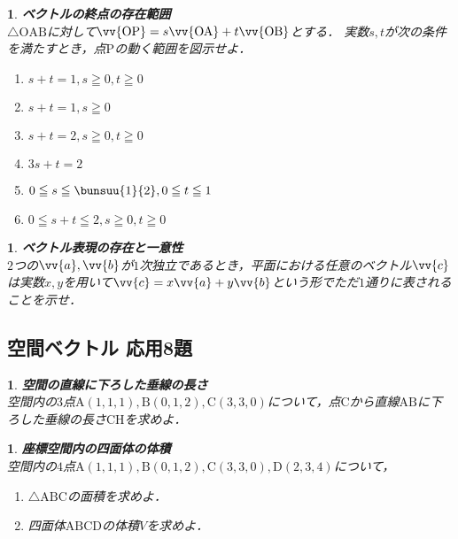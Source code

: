 \documentclass[10pt,
fleqn,
dvipdfmx,
uplatex
]{jsarticle}
\newtheorem{question}[Question]{}
\begin{document}
\begin{question}{\bf\boldmath ベクトルの終点の存在範囲}\\
$\triangle \text{OAB}$に対して$\vv {\text{OP}}=s\vv {\text{OA}}+t\vv {\text{OB}}$とする．
実数$s, t$が次の条件を満たすとき，点$\text{P}$の動く範囲を図示せよ．
\begin{enumerate}
\item $s+t=1, s\geqq 0, t\geqq 0$
\item $s+t=1, s\geqq 0$
\item $s+t=2, s\geqq 0, t\geqq 0$
\item $3s+t=2$
\item $0\leqq s\leqq \bunsuu{1}{2}, 0\leqq t\leqq 1$
\item $0\leqq s+t\leqq 2, s\geqq 0, t\geqq 0$
\end{enumerate}

\end{question}



\begin{question}{\bf\boldmath ベクトル表現の存在と一意性}\\
$2$つの$\vv {a}, \vv {b}$が$1$次独立であるとき，平面における任意のベクトル$\vv {c}$は実数$x, ‌y$を用いて$\vv {c}=x\vv {a}+y\vv {b}$という形でただ$1$通りに表されることを示せ．
\end{question}

\subsection{空間ベクトル 応用8題}



\begin{question}{\bf\boldmath 空間の直線に下ろした垂線の長さ}\\
空間内の$3$点$\text{A}\left(1,1,1\right), \text{B}\left(0,1,2\right), \text{C}\left(3,3,0\right)$について，点$\text{C}$から直線$\text{AB}$に下ろした垂線の長さ$\text{CH}$を求めよ．
\end{question}



\begin{question}{\bf\boldmath 座標空間内の四面体の体積}\\
空間内の$4$点$\text{A}\left(1,1,1\right), \text{B}\left(0,1,2\right), \text{C}\left(3,3,0\right), \text{D}\left(2,3,4\right)$について，
\begin{enumerate}
\item $\triangle \text{ABC}$の面積を求めよ．
\item 四面体$\text{ABCD}$の体積$V$を求めよ．
\end{enumerate}

\end{question}
\end{document}
